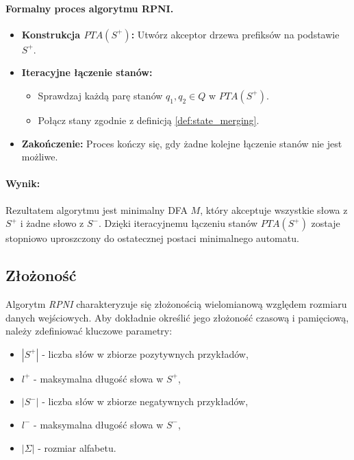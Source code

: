 \paragraph*{Formalny proces algorytmu RPNI.}
\begin{itemize}
    \item \textbf{Konstrukcja \( PTA(S^+) \):} Utwórz akceptor drzewa prefiksów na podstawie \( S^+ \).
    \item \textbf{Iteracyjne łączenie stanów:} 
    \begin{itemize}
        \item Sprawdzaj każdą parę stanów \( q_1, q_2 \in Q \) w \( PTA(S^+) \).
        \item Połącz stany zgodnie z definicją \ref{def:state_merging}.
    \end{itemize}
    \item \textbf{Zakończenie:} Proces kończy się, gdy żadne kolejne łączenie stanów nie jest możliwe.
\end{itemize}

\paragraph*{Wynik:}
Rezultatem algorytmu jest minimalny DFA \( M \), który akceptuje wszystkie słowa z \( S^+ \) i żadne słowo z \( S^- \). Dzięki iteracyjnemu łączeniu stanów \( PTA(S^+) \) zostaje stopniowo uproszczony do ostatecznej postaci minimalnego automatu.

\subsection{Złożoność}

Algorytm \textit{RPNI} charakteryzuje się złożonością wielomianową względem rozmiaru danych wejściowych. Aby dokładnie określić jego złożoność czasową i pamięciową, należy zdefiniować kluczowe parametry:
\begin{itemize}
    \item \(|S^+|\) - liczba słów w zbiorze pozytywnych przykładów,
    \item \( l^+ \) - maksymalna długość słowa w \( S^+ \),
    \item \(|S^-|\) - liczba słów w zbiorze negatywnych przykładów,
    \item \( l^- \) - maksymalna długość słowa w \( S^- \),
    \item \(|\Sigma|\) - rozmiar alfabetu.
\end{itemize}


